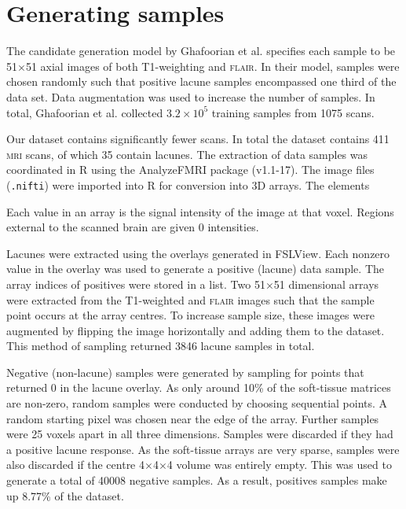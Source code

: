 

\section{Generating samples}\label{data-samples}

The candidate generation model by Ghafoorian et al. \cite{GhafoorianM.2017Dml3} specifies each sample to be 51$\times$51 axial images of both T1-weighting and \textsc{flair}. In their model, samples were chosen randomly such that positive lacune samples encompassed one third of the data set. Data augmentation was used to increase the number of samples. In total, Ghafoorian et al. collected $3.2\times10^5$ training samples from 1075 scans.

Our dataset contains significantly fewer scans. In total the dataset contains 411 \textsc{mri} scans, of which 35 contain lacunes. The extraction of data samples was coordinated in R using the AnalyzeFMRI package (v1.1-17). The image files (\texttt{.nifti}) were imported into R for conversion into 3D arrays. The elements

Each value in an array is the signal intensity of the image at that voxel. Regions external to the scanned brain are given 0 intensities.

Lacunes were extracted using the overlays generated in FSLView. Each nonzero value in the overlay was used to generate a positive (lacune) data sample. The array indices of positives were stored in a list. Two 51$\times$51 dimensional arrays were extracted from the T1-weighted and \textsc{flair} images such that the sample point occurs at the array centres. To increase sample size, these images were augmented by flipping the image horizontally and adding them to the dataset. This method of sampling returned 3846 lacune samples in total.


Negative (non-lacune) samples were generated by sampling for points that returned 0 in the lacune overlay. As only around 10\% of the soft-tissue matrices are non-zero, random samples were conducted by choosing sequential points. A random starting pixel was chosen near the edge of the array. Further samples were 25 voxels apart in all three dimensions. Samples were discarded if they had a positive lacune response. As the soft-tissue arrays are very sparse, samples were also discarded if the centre 4$\times$4$\times$4 volume was entirely empty. This was used to generate a total of 40008 negative samples. As a result, positives samples make up 8.77\% of the dataset.


